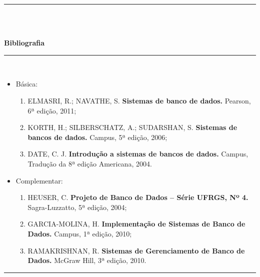 \noindent\rule{16.5cm}{0.4pt}\\
\\
\vspace{-12mm}
\begin{center}\textbf{Bibliografia}\end{center}
\vspace{-5mm}
\noindent\rule{16.5cm}{0.4pt}
\\
\begin{itemize} 
  \item Básica:
	\begin{enumerate}
  	\item 	ELMASRI, R.; NAVATHE, S. \textbf{Sistemas de banco de dados.} Pearson, 6ª edição, 2011;
	\item 	KORTH, H.; SILBERSCHATZ, A.; SUDARSHAN, S. \textbf{Sistemas de bancos de dados.} Campus, 5ª edição, 2006;
	\item 	DATE, C. J. \textbf{Introdução a sistemas de bancos de dados.} Campus, Tradução da 8ª edição Americana, 2004.      
	\end{enumerate}
    
  \item Complementar:
	\begin{enumerate}
  	\item 	HEUSER, C. \textbf{Projeto de Banco de Dados – Série UFRGS, Nº 4.} Sagra-Luzzatto, 5ª edição, 2004;
	\item 	GARCIA-MOLINA, H. \textbf{Implementação de Sistemas de Banco de Dados.} Campus, 1ª edição, 2010;
    \item 	RAMAKRISHNAN, R. \textbf{Sistemas de Gerenciamento de Banco de Dados.} McGraw Hill, 3ª edição, 2010.
	\end{enumerate}
\end{itemize}
\noindent\rule{16.5cm}{0.4pt}\\
\\